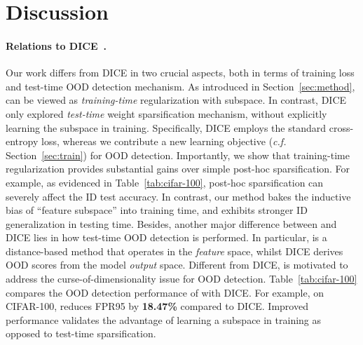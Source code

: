 \section{Discussion}
\label{sec:discussion}


\paragraph{Relations to DICE~\cite{sun2022dice}.} Our work differs from DICE in two crucial
aspects, both in terms of training loss and test-time OOD detection mechanism.
As introduced in Section~\ref{sec:method}, \name can be viewed as \emph{training-time} regularization with subspace. In contrast, DICE~\cite{sun2022dice}  only explored \emph{test-time} weight sparsification mechanism, without explicitly learning the subspace in training. Specifically, DICE employs the standard cross-entropy loss, whereas we contribute a new learning objective (\emph{c.f.} Section~\ref{sec:train}) for OOD detection. Importantly, we show that training-time regularization provides substantial gains over simple post-hoc sparsification. For example, as evidenced in Table~\ref{tab:cifar-100},  post-hoc sparsification can severely affect the ID test accuracy. In contrast, our method bakes the inductive bias of ``feature subspace'' into training time, and exhibits stronger ID generalization in testing time. Besides, another major difference between \name and DICE lies in how test-time OOD detection is performed. In particular, \name is a distance-based method that operates in the \emph{feature} space, whilst DICE derives OOD scores from the model \emph{output} space. Different from DICE, \name is motivated to address the curse-of-dimensionality issue for OOD detection. Table~\ref{tab:cifar-100} compares the OOD detection performance of \name with DICE. For example, on CIFAR-100, \name reduces FPR95 by \textbf{18.47\%} compared to DICE. Improved performance validates the advantage of learning a subspace in training as opposed to test-time sparsification.



